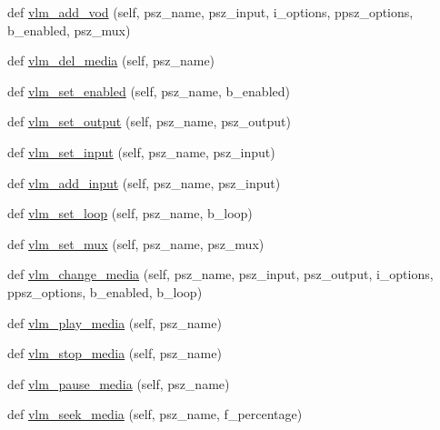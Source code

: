 \begin{DoxyCompactItemize}
\item 
def \hyperlink{classsrc_1_1lib_1_1vlc_1_1Instance_ad907d65cd7a79ce7a5d955d977cbc25f}{vlm\+\_\+add\+\_\+vod} (self, psz\+\_\+name, psz\+\_\+input, i\+\_\+options, ppsz\+\_\+options, b\+\_\+enabled, psz\+\_\+mux)
\item 
def \hyperlink{classsrc_1_1lib_1_1vlc_1_1Instance_ab8e66804afb92a9c6f3775f4612abb7f}{vlm\+\_\+del\+\_\+media} (self, psz\+\_\+name)
\item 
def \hyperlink{classsrc_1_1lib_1_1vlc_1_1Instance_a599996a68e080c26015912b8fce3633d}{vlm\+\_\+set\+\_\+enabled} (self, psz\+\_\+name, b\+\_\+enabled)
\item 
def \hyperlink{classsrc_1_1lib_1_1vlc_1_1Instance_a8c9c693d3207e845c65bad13c7a27751}{vlm\+\_\+set\+\_\+output} (self, psz\+\_\+name, psz\+\_\+output)
\item 
def \hyperlink{classsrc_1_1lib_1_1vlc_1_1Instance_a76cbc74f54e39271f1c1b4ad9de84449}{vlm\+\_\+set\+\_\+input} (self, psz\+\_\+name, psz\+\_\+input)
\item 
def \hyperlink{classsrc_1_1lib_1_1vlc_1_1Instance_a3fedc984ee9e327665ad0dbba8e2415f}{vlm\+\_\+add\+\_\+input} (self, psz\+\_\+name, psz\+\_\+input)
\item 
def \hyperlink{classsrc_1_1lib_1_1vlc_1_1Instance_a8e01b1f7711324d4702c17c84d7e8523}{vlm\+\_\+set\+\_\+loop} (self, psz\+\_\+name, b\+\_\+loop)
\item 
def \hyperlink{classsrc_1_1lib_1_1vlc_1_1Instance_ab9ba7289b99868457afa42c242ad2448}{vlm\+\_\+set\+\_\+mux} (self, psz\+\_\+name, psz\+\_\+mux)
\item 
def \hyperlink{classsrc_1_1lib_1_1vlc_1_1Instance_a2f8d66071d0fff9fbdb3c38ded9757e2}{vlm\+\_\+change\+\_\+media} (self, psz\+\_\+name, psz\+\_\+input, psz\+\_\+output, i\+\_\+options, ppsz\+\_\+options, b\+\_\+enabled, b\+\_\+loop)
\item 
def \hyperlink{classsrc_1_1lib_1_1vlc_1_1Instance_af1b49067ae43eca760e87d628d41a6a6}{vlm\+\_\+play\+\_\+media} (self, psz\+\_\+name)
\item 
def \hyperlink{classsrc_1_1lib_1_1vlc_1_1Instance_a2ab4493706ea9e3dca240a7512007c93}{vlm\+\_\+stop\+\_\+media} (self, psz\+\_\+name)
\item 
def \hyperlink{classsrc_1_1lib_1_1vlc_1_1Instance_acbfe87cd1265929f796d85edb5df1349}{vlm\+\_\+pause\+\_\+media} (self, psz\+\_\+name)
\item 
def \hyperlink{classsrc_1_1lib_1_1vlc_1_1Instance_ab6930768527cbc0152887132d6b07b48}{vlm\+\_\+seek\+\_\+media} (self, psz\+\_\+name, f\+\_\+percentage)

\end{DoxyCompactItemize}
